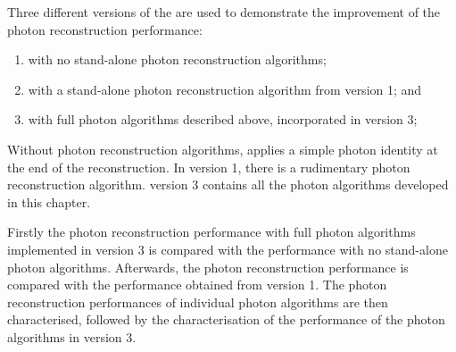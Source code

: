 

Three different versions of the \pandora are used to demonstrate the improvement of  the photon reconstruction performance:
\begin{enumerate}
  \item with no stand-alone photon reconstruction algorithms;
  \item with a stand-alone photon reconstruction algorithm from \pandora version 1; and
  \item with full photon algorithms described above, incorporated in \pandora version 3;
\end{enumerate}

Without photon reconstruction algorithms, \pandora applies a simple photon identity at the end of the reconstruction. In \pandora version 1, there is a rudimentary photon reconstruction algorithm. \pandora version 3 contains all the photon algorithms developed in this chapter.



Firstly the photon reconstruction performance with full photon algorithms implemented in \pandora version 3 is compared with the performance with no  stand-alone photon algorithms. Afterwards, the photon reconstruction performance  is compared with the performance obtained from  \pandora version 1. The photon reconstruction performances of individual photon algorithms are then characterised, followed by the characterisation of the performance of the photon algorithms in \pandora version 3.

